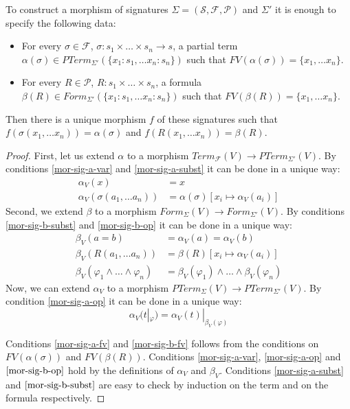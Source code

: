 \documentclass{amsart}
\theoremstyle{definition}
\theoremstyle{remark}
\numberwithin{figure}{section}
\begin{document}
\begin{prop}
To construct a morphism of signatures $\Sigma = (\mathcal{S},\mathcal{F},\mathcal{P})$ and $\Sigma'$ it is enough to specify the following data:
\begin{itemize}
\item For every $\sigma \in \mathcal{F}$, $\sigma : s_1 \times \ldots \times s_n \to s$, a partial term $\alpha(\sigma) \in PTerm_{\Sigma'}(\{ x_1 : s_1, \ldots x_n : s_n \})$ such that $FV(\alpha(\sigma)) = \{ x_1, \ldots x_n \}$.
\item For every $R \in \mathcal{P}$, $R : s_1 \times \ldots \times s_n$, a formula $\beta(R) \in Form_{\Sigma'}(\{ x_1 : s_1, \ldots x_n : s_n \})$ such that $FV(\beta(R)) = \{ x_1, \ldots x_n \}$.
\end{itemize}
Then there is a unique morphism $f$ of these signatures such that $f(\sigma(x_1, \ldots x_n)) = \alpha(\sigma)$ and $f(R(x_1, \ldots x_n)) = \beta(R)$.
\end{prop}
\begin{proof}
First, let us extend $\alpha$ to a morphism $Term_\mathcal{F}(V) \to PTerm_{\Sigma'}(V)$.
By conditions \eqref{mor-sig-a-var} and \eqref{mor-sig-a-subst} it can be done in a unique way:
\begin{align*}
\alpha_V(x) & = x \\
\alpha_V(\sigma(a_1, \ldots a_n)) & = \alpha(\sigma)[x_i \mapsto \alpha_V(a_i)]
\end{align*}
Second, we extend $\beta$ to a morphism $Form_\Sigma(V) \to Form_{\Sigma'}(V)$.
By conditions \eqref{mor-sig-b-subst} and \eqref{mor-sig-b-op} it can be done in a unique way:
\begin{align*}
\beta_V(a = b) & = \alpha_V(a) = \alpha_V(b) \\
\beta_V(R(a_1, \ldots a_n)) & = \beta(R)[x_i \mapsto \alpha_V(a_i)] \\
\beta_V(\varphi_1 \land \ldots \land \varphi_n) & = \beta_V(\varphi_1) \land \ldots \land \beta_V(\varphi_n)
\end{align*}
Now, we can extend $\alpha_V$ to a morphism $PTerm_\Sigma(V) \to PTerm_{\Sigma'}(V)$.
By condition \eqref{mor-sig-a-op} it can be done in a unique way:
\[ \alpha_V(t|_\varphi) = \alpha_V(t)|_{\beta_V(\varphi)} \]

Conditions \eqref{mor-sig-a-fv} and \eqref{mor-sig-b-fv} follows from the conditions on $FV(\alpha(\sigma))$ and $FV(\beta(R))$.
Conditions \eqref{mor-sig-a-var}, \eqref{mor-sig-a-op} and $\eqref{mor-sig-b-op}$ hold by the definitions of $\alpha_V$ and $\beta_V$.
Conditions \eqref{mor-sig-a-subst} and $\eqref{mor-sig-b-subst}$ are easy to check by induction on the term and on the formula respectively.
\end{proof}
\end{document}
